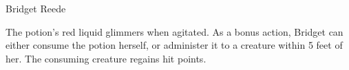 \begin{DndMonster}{Bridget Reede}
\begin{multicols}{2}
        The potion's red liquid glimmers when agitated.
        As a bonus action, Bridget can either consume the potion herself, or administer it to a creature within 5 feet of her.
        The consuming creature regains  hit points.














    \end{multicols}
\end{DndMonster}
